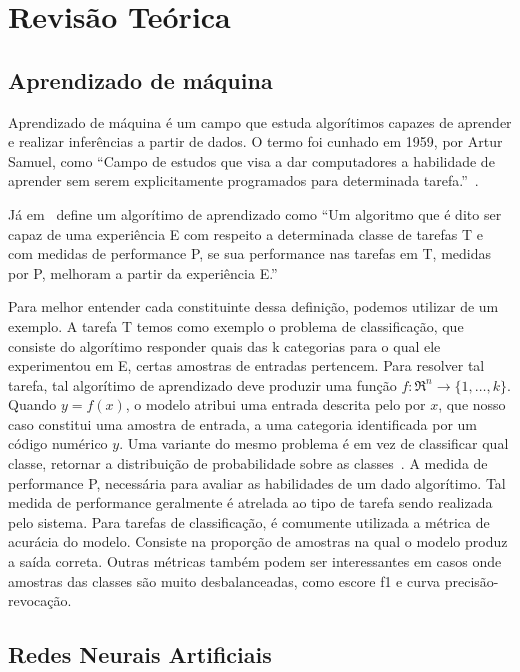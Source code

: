 \section{Revisão Teórica}\label{sec:Cap2_revisao_teorica}

\subsection{Aprendizado de máquina}\label{sec:aprendizado_maquina}

Aprendizado de máquina é um campo que estuda algorítimos capazes de aprender e realizar inferências a partir de dados. O termo foi cunhado em 1959, por Artur Samuel, como “Campo de estudos que visa a dar computadores a habilidade de aprender sem serem explicitamente programados para determinada tarefa.”~\cite{Samuel1959SomeSI}.

Já em~\cite{Mitchell97} define um algorítimo de aprendizado como “Um algoritmo que é dito ser capaz de uma experiência E com respeito a determinada classe de tarefas T e com medidas de performance P, se sua performance nas tarefas em T, medidas por P, melhoram a partir da experiência E.”

Para melhor entender cada constituinte dessa definição, podemos utilizar de um exemplo. A tarefa T temos como exemplo o problema de classificação, que consiste do algorítimo responder quais das k categorias para o qual ele experimentou em E, certas amostras de entradas pertencem. Para resolver tal tarefa, tal algorítimo de aprendizado deve produzir uma função \(f:\Re^n\rightarrow \{1,\ldots,k\}\). Quando \( y=f(x) \), o modelo atribui uma entrada descrita pelo por \(x\), que nosso caso constitui uma amostra de entrada, a uma categoria identificada por um código numérico \(y\). Uma variante do mesmo problema é em vez de classificar qual classe, retornar a distribuição de probabilidade sobre as classes~\cite{GoodBengCour16}. A medida de performance P, necessária para avaliar as habilidades de um dado algorítimo. Tal medida de performance geralmente é atrelada ao tipo de tarefa sendo realizada pelo sistema. Para tarefas de classificação, é comumente utilizada a métrica de acurácia do modelo. Consiste na proporção de amostras na qual o modelo produz a saída correta. Outras métricas também podem ser interessantes em casos onde amostras das classes são muito desbalanceadas, como escore f1 e curva precisão-revocação.


\subsection{Redes Neurais Artificiais}\label{sec:Cap2_redes_neurais}

